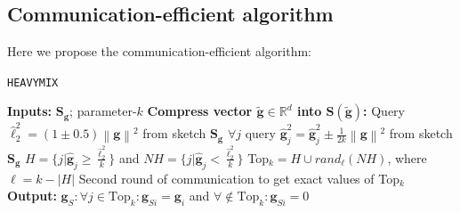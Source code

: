 \subsection{Communication-efficient algorithm}
Here we propose the communication-efficient algorithm:

\begin{algorithm}[H]
\caption{\texttt{HEAVYMIX}~\cite{ivkin2019communication} }\label{Alg:sketch}
\begin{algorithmic}[1]
\State \textbf{Inputs:} $\mathbf{S}_{\mathbf{g}}$; parameter-$k$
\State \textbf{Compress vector $\tilde{\mathbf{g}}\in\mathbb{R}^{d}$ into $\mathbf{S}\left(\tilde{\mathbf{g}}\right)$:}
\State Query $\hat{\ell}_2^2=\left(1\pm 0.5\right)\left\|\mathbf{g}\right\|^2$ from sketch $\mathbf{S}_{\mathbf{g}}$
\State $\forall j$ query $\hat{\mathbf{g}}_j^2=\hat{\mathbf{g}}_j^2\pm \frac{1}{2k}\left\|\mathbf{g}\right\|^2$ from sketch $\mathbf{S}_{\mathbf{g}}$
\State $H=\{j|\hat{\mathbf{g}}_j\geq \frac{\hat{\ell}_2^2}{k}\}$ and $NH=\{j|\hat{\mathbf{g}}_j<\frac{\hat{\ell}_2^2}{k}\}$
\State Top$_k=H\cup rand_\ell(NH)$, where $\ell=k-\left|H\right|$
\State Second round of communication to get exact values of Top$_k$ 
\State \textbf{Output:} $\mathbf{g}_S:\forall j\in\text{Top}_k:\mathbf{g}_{Si}=\mathbf{g}_{i}$ and $\forall\notin\text{Top}_k: \mathbf{g}_{Si}=0$
\end{algorithmic}
\end{algorithm}



